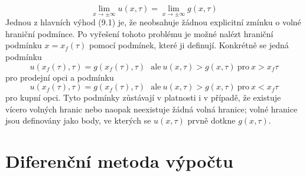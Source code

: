\documentclass[a4paper]{book}
\begin{document}
\begin{equation}
\underset{x \rightarrow \pm \infty} {\lim} u(x, \tau) = \underset{x \rightarrow \pm \infty} {\lim} g(x, \tau)
\end{equation}
Jednou z hlavních výhod (9.1) je, že neobsahuje žádnou explicitní zmínku o volné hraniční podmínce. Po vyřešení tohoto problému je možné nalézt hraniční podmínku $x = x_f(\tau)$ pomocí podmínek, které ji definují. Konkrétně se jedná podmínku
\begin{equation*}
u(x_f(\tau), \tau) = g(x_f(\tau), \tau) ~~~\text{ale}~ u(x, \tau) > g(x, \tau) ~\text{pro}~ x > x_f{\tau}
\end{equation*}
pro prodejní opci a podmínku
\begin{equation*}
u(x_f(\tau), \tau) = g(x_f(\tau), \tau) ~~~\text{ale}~ u(x, \tau) > g(x, \tau) ~\text{pro}~ x < x_f{\tau}
\end{equation*}
pro kupní opci. Tyto podmínky zůstávají v platnosti i v případě, že existuje vícero volných hranic nebo naopak neexistuje žádná volná hranice; volné hranice jsou definovány jako body, ve kterých se $u(x, \tau)$ prvně dotkne $g(x, \tau)$.

\section{Diferenční metoda výpočtu}
\end{document}

